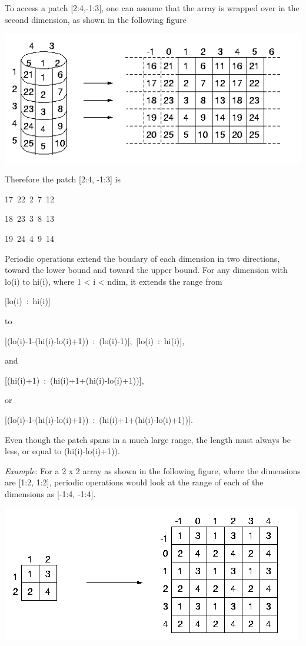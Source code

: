 To access a patch {[}2:4,-1:3{]}, one can assume that the array is
wrapped over in the second dimension, as shown in the following figure 

\includegraphics[scale=0.7]{periodic2}

Therefore the patch {[}2:4, -1:3{]} is
\begin{lyxcode}
17~22~2~7~12~

18~23~3~8~13~

19~24~4~9~14
\end{lyxcode}
Periodic operations extend the boudary of each dimension in two directions,
toward the lower bound and toward the upper bound. For any dimension
with lo(i) to hi(i), where 1 < i < ndim, it extends the range from 
\begin{lyxcode}
{[}lo(i)~:~hi(i){]}~
\end{lyxcode}
to 
\begin{lyxcode}
{[}(lo(i)-1-(hi(i)-lo(i)+1))~:~(lo(i)-1){]},~{[}lo(i)~:~hi(i){]},~
\end{lyxcode}
and 
\begin{lyxcode}
{[}(hi(i)+1)~:~(hi(i)+1+(hi(i)-lo(i)+1)){]},~
\end{lyxcode}
or 
\begin{lyxcode}
{[}(lo(i)-1-(hi(i)-lo(i)+1))~:~(hi(i)+1+(hi(i)-lo(i)+1)){]}.
\end{lyxcode}
Even though the patch spans in a much large range, the length must
always be less, or equal to (hi(i)-lo(i)+1)).

\emph{Example}: For a 2 x 2 array as shown in the following figure,
where the dimensions are {[}1:2, 1:2{]}, periodic operations would
look at the range of each of the dimensions as {[}-1:4, -1:4{]}.

\includegraphics[scale=0.7]{periodic3}

